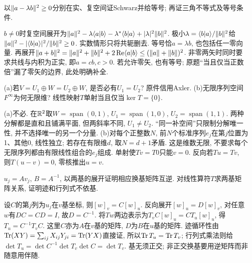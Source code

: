 \begin{exercise}
以$\lVert a-\lambda b\rVert^2\ge0$分别在实、复空间证Schwarz并给等号; 再证三角不等式及等号条件.
\end{exercise}
\begin{solution}
$b\ne0$时复空间展开为$\lVert a\rVert^2-\lambda\langle a\vert b\rangle-\lambda^*\langle b\vert a\rangle+|\lambda|^2\lVert b\rVert^2$. 极小$\lambda=\langle b\vert a\rangle/\lVert b\rVert^2$给$\lVert a\rVert^2-|\langle b\vert a\rangle|^2/\lVert b\rVert^2\ge0$. 实数情形只将共轭删去. 等号恰$a=\lambda b$, 也包括任一零向量. 再展开$\lVert a+b\rVert^2=\lVert a\rVert^2+\lVert b\rVert^2+2\operatorname{Re}\langle a\vert b\rangle\le(\lVert a\rVert+\lVert b\rVert)^2$. 非零两矢时同时要求共线与内积为正实, 即$a=cb,c>0$. 若允许零矢, 也有等号; 原题“当且仅当正数倍”漏了零矢的边界, 此处明确补全.
\end{solution}
\begin{exercise}
(a)若$V=U_1\oplus W=U_2\oplus W$, 是否必有$U_1=U_2$? 原件信用Axler. (b)无限序列空间$F^\infty$为何无限维? 线性映射$T$单射当且仅当$\ker T=\{0\}$.
\end{exercise}
\begin{solution}
(a)不必. 在$\mathbb R^2$取$W=\operatorname{span}(0,1)$, $U_1=\operatorname{span}(1,0)$, $U_2=\operatorname{span}(1,1)$. 两种分解都是直和且铺满平面, 但两斜率不同, $U_1\ne U_2$. “同一补空间”只限制分解唯一性, 并不选择唯一的另一个分量. (b)对每个正整数$N$, 前$N$个标准序列$e_j$在第$j$位置为1、其他0, 线性独立; 若存在有限维$d$, 取$N=d+1$矛盾. 这是维数无限, 不要求每个无限序列都由有限线性组合的$e_j$组成. 单射使$Tv=T0$只能$v=0$. 反向若$Tu=Tv$, 则$T(u-v)=0$, 零核推出$u=v$. 
\end{solution}
\begin{exercise}
$u_j=Av_j$, $B=A^{-1}$, 以两基的展开证明相应换基矩阵互逆. 对线性算符$T$求两基矩阵关系, 证明迹和行列式不依基.
\end{exercise}
\begin{solution}
设$C$的第$j$列为$u_j$在$v$基坐标, 则$[w]_v=C[w]_u$. 反向展开$[w]_u=D[w]_v$, 对任意$w$有$DC=CD=I$, 故$D=C^{-1}$. 将$Tw$两边表示为$T_vC[w]_u=CT_u[w]_u$, 得$T_u=C^{-1}T_vC$. 这里$C$亦为$A$在$v$基的矩阵, $D$为$B$在$u$基的矩阵. 迹循环性由$\operatorname{Tr}(XY)=\sum_{ij}X_{ij}Y_{ji}=\operatorname{Tr}(YX)$直接证, 所以$\operatorname{Tr} T_u=\operatorname{Tr} T_v$; 行列式乘法则给$\det T_u=\det C^{-1}\det T_v\det C=\det T_v$. 基无须正交; 非正交换基要用逆矩阵而非随意用伴随.
\end{solution}
